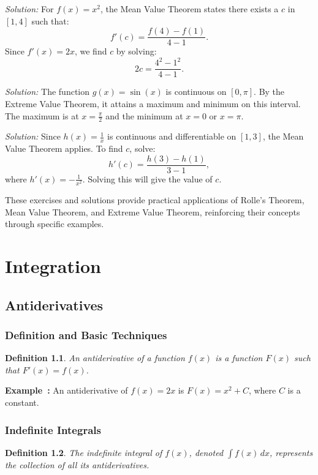 \documentclass[a4paper,12pt]{book}
\newenvironment{solution}[1][]
{\par\noindent\textit{Solution:} \rmfamily}{\medskip}
\newcounter{example}
\newenvironment{example}[1][\theexample]
  {\refstepcounter{example}\par\medskip\noindent\textbf{Example~#1:} \rmfamily}
  {\medskip}
\newtheorem{definition}{Definition}
\begin{document}
\begin{solution}[to Exercise 2]
For \( f(x) = x^2 \), the Mean Value Theorem states there exists a \( c \) in \([1, 4]\) such that:
\[ f'(c) = \frac{f(4) - f(1)}{4 - 1}. \]
Since \( f'(x) = 2x \), we find \( c \) by solving:
\[ 2c = \frac{4^2 - 1^2}{4 - 1}. \]
\end{solution}

\begin{solution}[to Exercise 3]
The function \( g(x) = \sin(x) \) is continuous on \([0, \pi]\). By the Extreme Value Theorem, it attains a maximum and minimum on this interval. The maximum is at \( x = \frac{\pi}{2} \) and the minimum at \( x = 0 \) or \( x = \pi \).
\end{solution}

\begin{solution}[to Exercise 4]
Since \( h(x) = \frac{1}{x} \) is continuous and differentiable on \([1, 3]\), the Mean Value Theorem applies. To find \( c \), solve:
\[ h'(c) = \frac{h(3) - h(1)}{3 - 1}, \]
where \( h'(x) = -\frac{1}{x^2} \). Solving this will give the value of \( c \).
\end{solution}

These exercises and solutions provide practical applications of Rolle's Theorem, Mean Value Theorem, and Extreme Value Theorem, reinforcing their concepts through specific examples.





\chapter{Integration}
\section{Antiderivatives}
\subsection{Definition and Basic Techniques}
\begin{definition}
An antiderivative of a function \( f(x) \) is a function \( F(x) \) such that \( F'(x) = f(x) \).
\end{definition}
\begin{example}
An antiderivative of \( f(x) = 2x \) is \( F(x) = x^2 + C \), where \( C \) is a constant.
\end{example}

\subsection{Indefinite Integrals}
\begin{definition}
The indefinite integral of \( f(x) \), denoted \( \int f(x) \, dx \), represents the collection of all its antiderivatives.
\end{definition}
\end{document}

